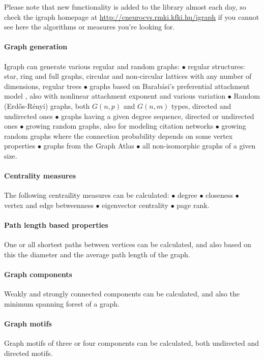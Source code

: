\documentclass[twoside]{book}%
\begin{document}
Please note that new functionality is added to the library almost each
day, so check the igraph homepage at
\url{http://cneurocvs.rmki.kfki.hu/igraph} if you cannot see here the
algorithms or measures you're looking for. 

\paragraph{Graph generation} Igraph can generate various regular and
random graphs: $\bullet$ regular structures: star, ring and full
graphs, circular and non-circular lattices with any number of
dimensions, regular trees $\bullet$ graphs based on Barab\'asi's
preferential attachment model \cite{barabasi99a}, also with nonlinear
attachment exponent and various variation $\bullet$ Random
(Erd\H{o}s-R\'enyi) graphs, both $G(n,p)$ and $G(n,m)$ types, directed
and undirected ones $\bullet$ graphs having a given degree sequence,
directed or undirected ones $\bullet$ growing random graphs, also for
modeling citation networks $\bullet$ growing random graphs where the
connection probability depends on some vertex properties $\bullet$
graphs from the Graph Atlas $\bullet$ all non-isomorphic graphs of a
given size.

\paragraph{Centrality measures} The following centraility measures can
be calculated: $\bullet$ degree $\bullet$ closeness $\bullet$
vertex and edge betweenness $\bullet$ eigenvector centrality $\bullet$
page rank.

\paragraph{Path length based properties} One or all shortest paths
between vertices can be calculated, and also based on this the
diameter and the average path length of the graph.

\paragraph{Graph components} Weakly and strongly connected components
can be calculated, and also the minimum spanning forest of a graph.

\paragraph{Graph motifs} Graph motifs of three or four components can
be calculated, both undirected and directed motifs.
\end{document}
